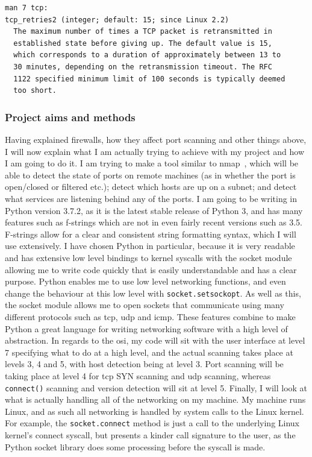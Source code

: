 \documentclass[titlepage]{article}
\let\Oldsubsubsection\subsubsection{}
\renewcommand{\subsubsection}{\FloatBarrier\Oldsubsubsection}
\begin{document}
\begin{verbatim}
man 7 tcp:
tcp_retries2 (integer; default: 15; since Linux 2.2)
  The maximum number of times a TCP packet is retransmitted in
  established state before giving up. The default value is 15,
  which corresponds to a duration of approximately between 13 to
  30 minutes, depending on the retransmission timeout. The RFC
  1122 specified minimum limit of 100 seconds is typically deemed
  too short.
\end{verbatim}

\subsubsection{Project aims and methods}\label{pythonreason}
Having explained firewalls, how they affect port scanning and other things above, I will now explain 
what I am actually trying to achieve with my project and how I am going to do it. I am trying to 
make a tool similar to nmap~\cite{download:nmap}, which will be able to detect the state
of ports on remote machines (as in whether the port is open/closed or filtered etc.);
detect which hosts are up on a subnet; and detect what services are listening behind any of the ports.
I am going to be writing in Python version 3.7.2, as it is the latest stable release of Python 3,
and has many features such as f-strings which are not in even fairly recent versions such as 3.5.
F-strings allow for a clear and consistent string formatting syntax, which I will use extensively.
I have chosen Python in particular, because it is very readable and has extensive low level bindings
to kernel syscalls with the socket module allowing me to write code quickly that is easily 
understandable and has a clear purpose. Python enables me to use low level networking 
functions, and even change the behaviour at this low level with \verb|socket.setsockopt|. As well 
as this, the socket module allows me to open sockets that communicate using many different protocols 
such as \gls{tcp}, \gls{udp} and \gls{icmp}. These features combine to make 
Python a great language for writing networking software with a high level of abstraction. In regards 
to the \gls{osi}, my code will sit with the user interface at level 7 specifying what to do at a high 
level, and the actual scanning takes place at levels 3, 4 and 5, with host detection being at level 
3. Port scanning will be taking place at level 4 for \gls{tcp} SYN scanning and \gls{udp} scanning,
whereas \verb|connect()| scanning and version detection will sit at level 5. Finally, I will look at 
what is actually handling all of the networking on my machine. My machine runs Linux, and as such all 
networking is handled by system calls to the Linux kernel. For example, the \verb|socket.connect| 
method is just a call to the underlying Linux kernel's connect syscall, but presents a kinder call 
signature to the user, as the Python socket library does some processing before the syscall is made.
\end{document}

